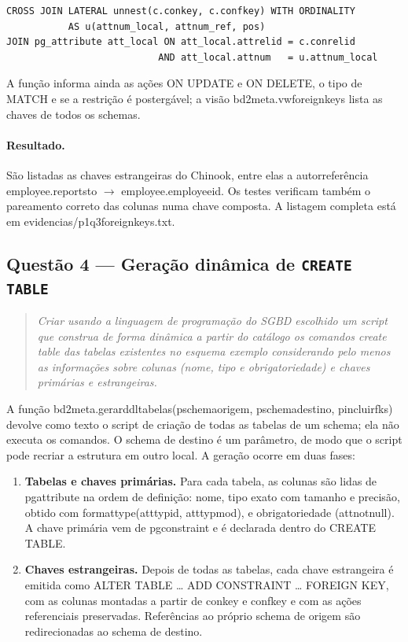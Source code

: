 \documentclass[11pt,a4paper]{article}
\newcommand{\cod}[1]{{\ttfamily\renewcommand{\_}{\textunderscore\allowbreak}#1}}
\newenvironment{enunciado}{\begin{quote}\small\itshape}{\end{quote}}
\begin{document}
\begin{lstlisting}
CROSS JOIN LATERAL unnest(c.conkey, c.confkey) WITH ORDINALITY
           AS u(attnum_local, attnum_ref, pos)
JOIN pg_attribute att_local ON att_local.attrelid = c.conrelid
                           AND att_local.attnum   = u.attnum_local
\end{lstlisting}

A função informa ainda as ações \cod{ON UPDATE} e \cod{ON DELETE}, o tipo de \cod{MATCH} e se a restrição é
postergável; a visão \cod{bd2\_meta.vw\_foreign\_keys} lista as chaves de todos os schemas.

\paragraph{Resultado.} São listadas as \numFKsPublic{} chaves estrangeiras do Chinook, entre elas a
autorreferência \cod{employee.reports\_to} $\rightarrow$ \cod{employee.employee\_id}. Os testes verificam também o
pareamento correto das colunas numa chave composta. A listagem completa está em
\cod{evidencias/p1\_q3\_foreign\_keys.txt}.

\subsection{Questão 4 --- Geração dinâmica de \texttt{CREATE TABLE}}

\begin{enunciado}
Criar usando a linguagem de programação do SGBD escolhido um script que construa de forma dinâmica a partir do
catálogo os comandos create table das tabelas existentes no esquema exemplo considerando pelo menos as
informações sobre colunas (nome, tipo e obrigatoriedade) e chaves primárias e estrangeiras.
\end{enunciado}

A função \cod{bd2\_meta.gerar\_ddl\_tabelas(p\_schema\_origem, p\_schema\_destino, p\_incluir\_fks)} devolve como
texto o script de criação de todas as tabelas de um schema; ela não executa os comandos. O schema de destino é um
parâmetro, de modo que o script pode recriar a estrutura em outro local. A geração ocorre em duas fases:

\begin{enumerate}
  \item \textbf{Tabelas e chaves primárias.} Para cada tabela, as colunas são lidas de \cod{pg\_attribute} na
        ordem de definição: nome, tipo exato com tamanho e precisão, obtido com
        \cod{format\_type(atttypid, atttypmod)}, e obrigatoriedade (\cod{attnotnull}). A chave primária vem de
        \cod{pg\_constraint} e é declarada dentro do \cod{CREATE TABLE}.
  \item \textbf{Chaves estrangeiras.} Depois de todas as tabelas, cada chave estrangeira é emitida como
        \cod{ALTER TABLE \dots{} ADD CONSTRAINT \dots{} FOREIGN KEY}, com as colunas montadas a partir de
        \cod{conkey} e \cod{confkey} e com as ações referenciais preservadas. Referências ao próprio schema de
        origem são redirecionadas ao schema de destino.
\end{enumerate}
\end{document}
